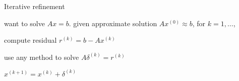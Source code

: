 \documentclass[presentation,xcolor={usenames,dvipsnames}]{beamer}
\begin{document}
\begin{frame}{Iterative refinement}

want to solve $Ax = b$.
\vfill
given approximate solution $A x^{(0)} \approx b$, for $k=1,\ldots$,
\bit
\item compute residual $r^{(k)} = b - A x^{(k)}$
\item use any method to solve $A \delta^{(k)} = r^{(k)}$
\item $x^{(k+1)} = x^{(k)} + \delta^{(k)}$
\eit

\end{frame}


\end{document}
